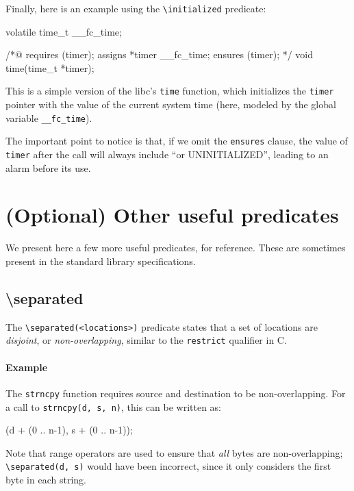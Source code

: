 \documentclass{frama-c-book}
\begin{document}
Finally, here is an example using the \verb+\initialized+ predicate:

\begin{listing-nonumber}
volatile time_t __fc_time;

/*@
  requires \valid(timer);
  assigns *timer \from __fc_time;
  ensures \initialized(timer);
*/
void time(time_t *timer);
\end{listing-nonumber}

This is a simple version of the libc's \texttt{time} function, which
initializes the \texttt{timer} pointer with the value of the current system
time (here, modeled by the global variable \verb+__fc_time+).

The important point to notice is that, if we omit the \texttt{ensures} clause,
the value of \texttt{timer} after the call will always include
``or UNINITIALIZED'', leading to an alarm before its use.

\section{(Optional) Other useful predicates}

We present here a few more useful predicates, for reference. These are
sometimes present in the \FramaC standard library specifications.

\subsection*{\textbackslash{}separated}

The \verb+\separated(<locations>)+ predicate states that a set of locations
are {\em disjoint}, or {\em non-overlapping}, similar to the \texttt{restrict}
qualifier in C.

\paragraph{Example}

The \texttt{strncpy} function requires source and destination to be
non-overlapping. For a call to \verb+strncpy(d, s, n)+, this can be written as:

\begin{listing-nonumber}
  \separated(d + (0 .. n-1), s + (0 .. n-1));
\end{listing-nonumber}

Note that range operators are used to ensure that {\em all} bytes are
non-overlapping; \verb+\separated(d, s)+ would have been incorrect, since it
only considers the first byte in each string.
\end{document}
